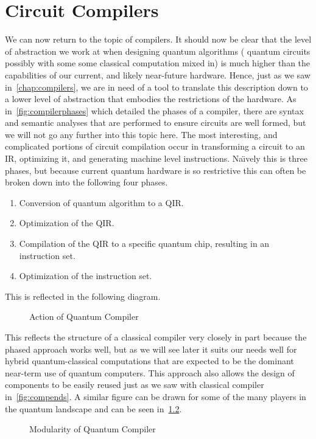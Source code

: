 \chapter{Circuit Compilers}\label{chap:circuit-compilers}

We can now return to the topic of compilers.
It should now be clear that the level of abstraction we work at when designing quantum algorithms (\ie{} quantum circuits possibly with some some classical computation mixed in) is much higher than the capabilities of our current, and likely near-future hardware.
Hence, just as we saw in~\cref{chap:compilers}, we are in need of a tool to translate this description down to a lower level of abstraction that embodies the restrictions of the hardware.
As in~\cref{fig:compilerphases} which detailed the phases of a compiler, there are syntax and semantic analyses that are performed to ensure circuits are well formed, but we will not go any further into this topic here.
The most interesting, and complicated portions of circuit compilation occur in transforming a circuit to an \ac{IR}, optimizing it, and generating machine level instructions.
Na\"{\i}vely this is three phases, but because current quantum hardware is so restrictive this can often be broken down into the following four phases.

\begin{enumerate}
    \item Conversion of quantum algorithm to a \ac{QIR}.
    \item Optimization of the \ac{QIR}.
    \item Compilation of the \ac{QIR} to a specific quantum chip, resulting in an instruction set.
    \item Optimization of the instruction set.
\end{enumerate}
This is reflected in the following diagram.
\begin{figure}[h] %
    \centering
    
    \caption{Action of Quantum Compiler}\label{fig:quantumcompiler}
\end{figure}

This reflects the structure of a classical compiler very closely in part because the phased approach works well, but as we will see later it suits our needs well for hybrid quantum-classical computations that are expected to be the dominant near-term use of quantum computers.
This approach also allows the design of components to be easily reused just as we saw with classical compiler in~\cref{fig:compends}.
A similar figure can be drawn for some of the many players in the quantum landscape and can be seen in~\cref{fig:optionsq}.
\begin{figure}[ht]
    \centering
    
    \caption{Modularity of Quantum Compiler}\label{fig:optionsq}
\end{figure}

